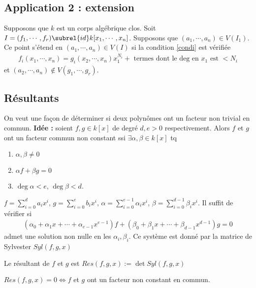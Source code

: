         \subsection{Application 2 : extension}
            Supposons que $k$ est un corps algébrique clos. Soit $I = (f_1, \cdots, f_r) \subrel{id} k[x_1, \cdots, x_n]$. Supposons que $(a_1, \cdots, a_n) \in V(I_1)$. Ce point s'étend en $(a_1, \cdots, a_n) \in V(I)$ si la condition \ref{condi} est vérifiée
            \label{condi}
            \begin{align}
                f_i(x_1, \cdots, x_n) = g_i(x_2, \cdots, x_n) x_1^{N_i} + \text{ termes dont le deg en } x_1 \text{ est } < N_i
            \end{align}
            et $(a_2, \cdots, a_n) \notin V(g_1, \cdots, g_r)$.

        \subsection{Résultants}
            On veut une façon de déterminer si deux polynômes ont un facteur non trivial en commun. \textbf{Idée :} soient $f,g \in k[x]$ de degré $d,e > 0$ respectivement. Alors $f$ et $g$ ont un facteur commun non constant ssi $\exists \alpha, \beta \in k[x]$ tq 
            \begin{enumerate}
                \item $\alpha, \beta \neq 0$
                \item $\alpha f + \beta g = 0$
                \item $\deg \alpha < e$, $\deg \beta < d$.
            \end{enumerate}
            $f = \sum_{i = 0}^d a_ix^i$, $g = \sum_{i = 0}^e b_i x^i$, $\alpha = \sum_{i = 0}^{e-1} \alpha_i x^i$, $\beta = \sum_{i = 0}^{d-1} \beta_i x^i$. Il suffit de vérifier si
            \begin{align*}
                (\alpha_0 + \alpha_1x + \cdots + \alpha_{e-1}x^{e-1})f + (\beta_0 + \beta_1x + \cdots + \beta_{d-1}x^{d-1})g = 0
            \end{align*}
            admet une solution non nulle en les $\alpha_i, \beta_i$. Ce système est donné par la matrice de Sylvester $Syl(f,g,x)$
            \begin{defi}
                Le résultant de $f$ et $g$ est $Res(f,g,x) := \det Syl(f,g,x)$
            \end{defi}
            \begin{prop}
                $Res(f,g,x) = 0 \iff f$ et $g$ ont un facteur non constant en commun.
            \end{prop}